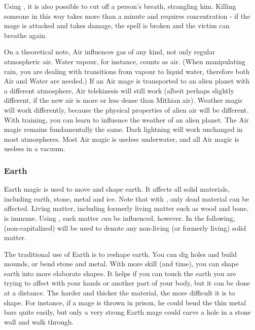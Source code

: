 Using \Itzach{}, it is also possible to cut off a person's breath, strangling him. Killing someone in this way takes more than a minute and requires concentration - if the mage is attacked and takes damage, the spell is broken and the victim can breathe again. 

On a theoretical note, Air influences gas of any kind, not only regular atmospheric air. Water vapour, for instance, counts as air. (When manipulating rain, you are dealing with transitions from vapour to liquid water, therefore both Air and Water are needed.) If an Air mage is transported to an alien planet with a different atmosphere, Air telekinesis will still work (albeit perhaps slightly different, if the new air is more or less dense than Mithian air). Weather magic will work differently, because the physical properties of alien air will be different. With training, you can learn to influence the weather of an alien planet. The Air magic remains fundamentally the same. Dark lightning will work unchanged in most atmospheres. Most Air magic is useless underwater, and all Air magic is useless in a vacuum. 



\subsubsection{Earth}
Earth magic is used to move and shape earth. It affects all solid materials, including earth, stone, metal and ice. Note that with \Iquin{}, only dead material can be affected. Living matter, including formerly living matter such as wood and bone, is immune. Using \Itzach{}, such matter \emph{can} be influenced, however. In the following,  (non-capitalized) will be used to denote any non-living (or formerly living) solid matter. 


The traditional use of Earth is to reshape earth. You can dig holes and build mounds, or bend stone and metal. With more skill (and time), you can shape earth into more elaborate shapes. It helps if you can touch the earth you are trying to affect with your hands or another part of your body, but it can be done at a distance. The harder and thicker the material, the more difficult it is to shape. For instance, if a mage is thrown in prison, he could bend the thin metal bars quite easily, but only a very strong Earth mage could carve a hole in a stone wall and walk through. 

